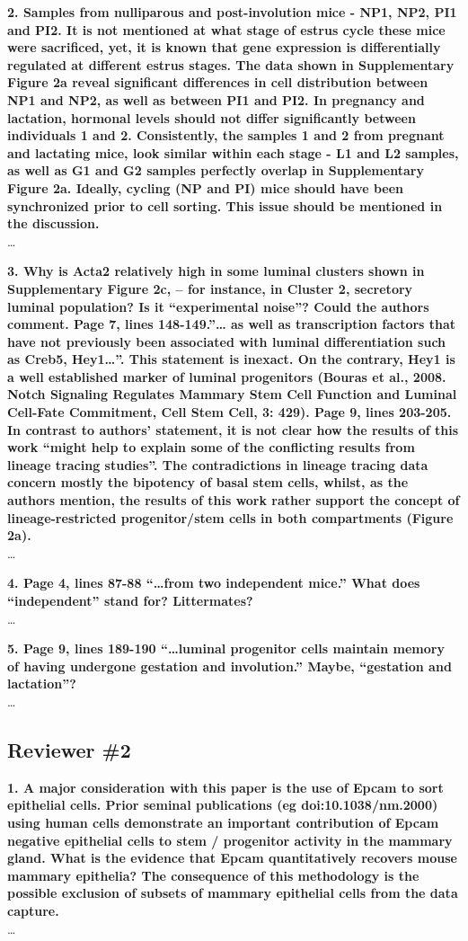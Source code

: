 \documentclass{article}
\begin{document}
\textbf{2. Samples from nulliparous and post-involution mice - NP1, NP2, PI1 and PI2. It is not mentioned at what stage of estrus cycle these mice were sacrificed, yet, it is known that gene expression is differentially regulated at different estrus stages. The data shown in Supplementary Figure 2a reveal significant differences in cell distribution between NP1 and NP2, as well as between PI1 and PI2. In pregnancy and lactation, hormonal levels should not differ significantly between individuals 1 and 2. Consistently, the samples 1 and 2 from pregnant and lactating mice, look similar within each stage - L1 and L2 samples, as well as G1 and G2 samples perfectly overlap in Supplementary Figure 2a. Ideally, cycling (NP and PI) mice should have been synchronized prior to cell sorting. This issue should be mentioned in the discussion.}\\
\ldots

\textbf{3. Why is Acta2 relatively high in some luminal clusters shown in Supplementary Figure 2c, – for instance, in Cluster 2, secretory luminal population? Is it “experimental noise”? Could the authors comment.
Page 7, lines 148-149.”… as well as transcription factors that have not previously been associated with luminal differentiation such as Creb5, Hey1…”. This statement is inexact. On the contrary, Hey1 is a well established marker of luminal progenitors (Bouras et al., 2008. Notch Signaling Regulates Mammary Stem Cell Function and Luminal Cell-Fate Commitment, Cell Stem Cell, 3: 429).
Page 9, lines 203-205. In contrast to authors’ statement, it is not clear how the results of this work “might help to explain some of the conflicting results from lineage tracing studies”. The contradictions in lineage tracing data concern mostly the bipotency of basal stem cells, whilst, as the authors mention, the results of this work rather support the concept of lineage-restricted progenitor/stem cells in both compartments (Figure 2a).}\\
\ldots

\textbf{4. Page 4, lines 87-88 “…from two independent mice.” What does “independent” stand for? Littermates?}\\
\ldots

\textbf{5. Page 9, lines 189-190 “…luminal progenitor cells maintain memory of having undergone gestation and involution.” Maybe, “gestation and lactation”?}\\
\ldots

\subsection*{Reviewer \#2}
\textbf{1. A major consideration with this paper is the use of Epcam to sort epithelial cells. Prior seminal publications (eg doi:10.1038/nm.2000) using human cells demonstrate an important contribution of Epcam negative epithelial cells to stem / progenitor activity in the mammary gland. What is the evidence that Epcam quantitatively recovers mouse mammary epithelia? The consequence of this methodology is the possible exclusion of subsets of mammary epithelial cells from the data capture.}\\
\ldots
\end{document}
